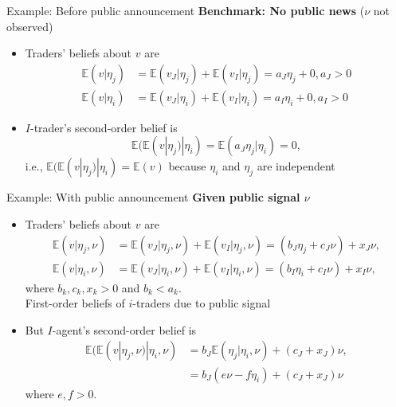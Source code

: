 \documentclass[english,10pt
,aspectratio=169
]{beamer}
\begin{document}
\begin{frame}{Example: Before public announcement}
	\textbf{Benchmark: No public news} ($\nu$ not observed)
	\begin{itemize}
		\item Traders' beliefs about $v$ are
		\begin{align*}
			\mathbb{E}(v|\eta_j) & =\mathbb{E}(v_{J}|\eta_j)+\mathbb{E}(v_{I}|\eta_j)=a_J \eta_j+0, a_J>0 \\
			\mathbb{E}(v|\eta_i) &=\mathbb{E}(v_{J}|\eta_i)+\mathbb{E}(v_{I}|\eta_i)=a_I \eta_i+0, a_I>0
		\end{align*}
		\item $I$-trader's second-order belief is
		\[
		\mathbb{E}(\mathbb{E}(v|\eta_j)|\eta_i)=\mathbb{E}(a_J \eta_j | \eta_i) = 0,
		\]
		i.e., $\mathbb{E}(\mathbb{E}(v|\eta_j)|\eta_i) = \mathbb{E}(v)$ because $\eta_i$ and $\eta_j$ are independent
	\end{itemize}
\end{frame}


\begin{frame}{Example: With public announcement}
	\textbf{Given public signal $\nu$}
	\begin{itemize}
		\item Traders' beliefs about $v$ are
		\begin{align*}
			\mathbb{E}(v|\eta_j, \nu) & =\mathbb{E}(v_{J}|\eta_j,\nu)+\mathbb{E}(v_{I}|\eta_j,\nu)=(b_J \eta_j+c_J\nu)+x_J \nu,  \\
			\mathbb{E}(v|\eta_i, \nu) & =\mathbb{E}(v_{J}|\eta_i,\nu)+\mathbb{E}(v_{I}|\eta_i,\nu)=(b_I \eta_i+c_I \nu)+x_I \nu,
		\end{align*}
		where $b_k,c_k,x_k>0$ and $b_k<a_k$. \\
		First-order beliefs of $i$-traders  due to public signal
		\pause
		\item But $I$-agent's second-order belief  is
		\begin{align*}
			\mathbb{E}(\mathbb{E}(v|\eta_j,\nu)|\eta_i,\nu)
			&=b_J\mathbb{E}(\eta_j|\eta_i,\nu)+(c_J+x_J)\nu, \\
			&=b_J(e\nu-f\eta_i)+(c_J+x_J)\nu 
		\end{align*}
		where $e,f>0$. 
		
	\end{itemize}
\end{frame}
\end{document}
